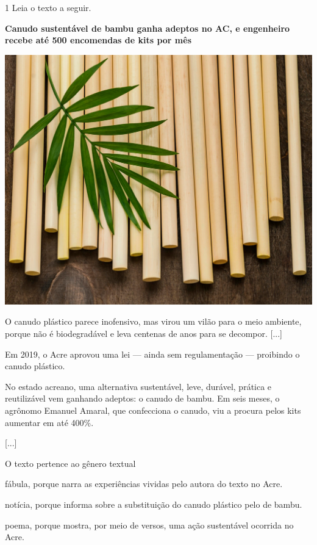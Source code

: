 \begin{conteudo}
\begin{conteudo}
\begin{conteudo}
\begin{conteudo}
\num{1} Leia o texto a seguir.

\begin{myquote}
\textbf{Canudo sustentável de bambu ganha adeptos no AC, e engenheiro
recebe até 500 encomendas de kits por mês}

\begin{center}
\noindent\includegraphics[width=.4\textwidth]{media/image20c.jpg}
\end{center}

O canudo plástico parece inofensivo, mas virou um vilão para o meio
ambiente, porque não é biodegradável e leva centenas de anos para se
decompor. {[}...{]}

Em 2019, o Acre aprovou uma lei --- ainda sem regulamentação ---
proibindo o canudo plástico.

No estado acreano, uma alternativa sustentável, leve, durável, prática e
reutilizável vem ganhando adeptos: o canudo de bambu. Em seis meses, o
agrônomo Emanuel Amaral, que confecciona o canudo, viu a procura pelos
kits aumentar em até 400\%.

{[}...{]}

\end{myquote} 

O texto pertence ao gênero textual

\begin{escolha}
\item fábula, porque narra as experiências vividas pelo autora do texto no Acre.

\item notícia, porque informa sobre a substituição do canudo plástico pelo de bambu.

\item poema, porque mostra, por meio de versos, uma ação sustentável ocorrida no Acre.


\end{escolha}
\end{conteudo}
\end{conteudo}
\end{conteudo}
\end{conteudo}
